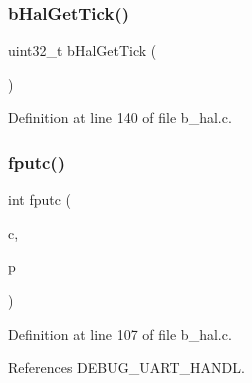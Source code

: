 \subsubsection{\texorpdfstring{b\+Hal\+Get\+Tick()}{bHalGetTick()}}
{\footnotesize\ttfamily uint32\+\_\+t b\+Hal\+Get\+Tick (\begin{DoxyParamCaption}{ }\end{DoxyParamCaption})}



Definition at line 140 of file b\+\_\+hal.\+c.

\mbox{\label{group___h_a_l___exported___functions_gaf709c07e26adbffa5d9984b2cec63c69}} 
\subsubsection{\texorpdfstring{fputc()}{fputc()}}
{\footnotesize\ttfamily int fputc (\begin{DoxyParamCaption}\item[{int}]{c,  }\item[{F\+I\+LE $\ast$}]{p }\end{DoxyParamCaption})}



Definition at line 107 of file b\+\_\+hal.\+c.



References D\+E\+B\+U\+G\+\_\+\+U\+A\+R\+T\+\_\+\+H\+A\+N\+DL.

